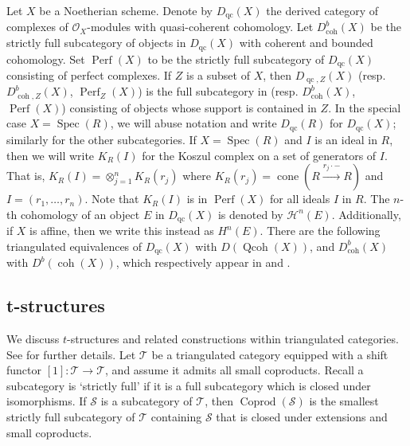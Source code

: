 \documentclass[11pt]{amsart}
\theoremstyle{plain}
\theoremstyle{definition}
\numberwithin{equation}{section}
\numberwithin{theorem}{section}
\begin{document}
Let $X$ be a Noetherian scheme. Denote by $D_{\operatorname{qc}}(X)$ the derived category of complexes of $\mathcal{O}_X$-modules with quasi-coherent cohomology. Let $D^b_{\operatorname{coh}}(X)$ be the strictly full subcategory of objects in $D_{\operatorname{qc}}(X)$ with coherent and bounded cohomology. Set $\operatorname{Perf}(X)$ to be the strictly full subcategory of $D_{\operatorname{qc}}(X)$ consisting of perfect complexes. If $Z$ is a subset of $X$, then $D_{\operatorname{qc},Z}(X)$ (resp. $D^b_{\operatorname{coh},Z}(X)$, $\operatorname{Perf}_Z (X)$) is the full subcategory in (resp. $D^b_{\operatorname{coh}}(X)$, $\operatorname{Perf} (X)$) consisting of objects whose support is contained in $Z$. In the special case $X=\operatorname{Spec}(R)$, we will abuse notation and write $D_{\operatorname{qc}}(R)$ for $D_{\operatorname{qc}}(X)$; similarly for the other subcategories. If $X=\operatorname{Spec}(R)$ and $I$ is an ideal in $R$, then we will write $K_R(I)$ for the Koszul complex on a set of generators of $I$. That is, $K_R(I)= \otimes^n_{j=1} K_R(r_j)$ where $K_R (r_j)=\operatorname{cone}(R \xrightarrow{r_j \cdot - } R)$ and $I=(r_1,\ldots,r_n)$. Note that $K_R(I)$ is in $\operatorname{Perf}(X)$ for all ideals $I$ in $R$. The $n$-th cohomology of an object $E$ in $D_{\operatorname{qc}}(X)$ is denoted by $\mathcal{H}^n (E)$. Additionally, if $X$ is affine, then we write this instead as $H^n (E)$. There are the following triangulated equivalences of $D_{\operatorname{qc}}(X)$ with $D(\operatorname{Qcoh}(X))$, and $D^b_{\operatorname{coh}}(X)$ with $D^b (\operatorname{coh}(X))$, which respectively appear in \cite[\href{https://stacks.math.columbia.edu/tag/09T4}{Tag 09T4}]{StacksProject} and \cite[\href{https://stacks.math.columbia.edu/tag/0FDB}{Tag 0FDB}]{StacksProject}. 

\subsection{t-structures}
\label{sec:t_structures}

We discuss $t$-structures and related constructions within triangulated categories. See \cite{Beilinson/Berstein/Deligne/Gabber:2018} for further details. Let $\mathcal{T}$ be a triangulated category equipped with a shift functor $[1]\colon \mathcal{T} \to \mathcal{T}$, and assume it admits all small coproducts. Recall a subcategory is `strictly full' if it is a full subcategory which is closed under isomorphisms. If $\mathcal{S}$ is a subcategory of $\mathcal{T}$, then $\operatorname{Coprod}(\mathcal{S})$ is the smallest strictly full subcategory of $\mathcal{T}$ containing $\mathcal{S}$ that is closed under extensions and small coproducts.
\end{document}
